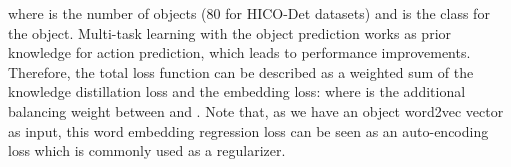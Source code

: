 where  is the number of objects (80 for HICO-Det datasets) and  is the class for the object.
Multi-task learning with the object prediction works as prior knowledge for action prediction, which leads to performance improvements.
Therefore, the total loss function can be described as a weighted sum of the knowledge distillation loss and the embedding loss:
where  is the additional balancing weight between  and .
Note that, as we have an object word2vec vector as input, this word embedding regression loss can be seen as an auto-encoding loss which is commonly used as a regularizer.



















